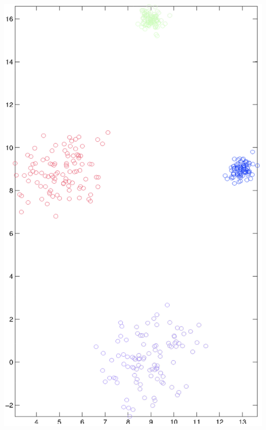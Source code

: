 \documentclass{article}
\begin{document}
\begin{center}
    \includegraphics[scale=0.5]{images/Q2P4E.png}
\end{center}
\end{document}
